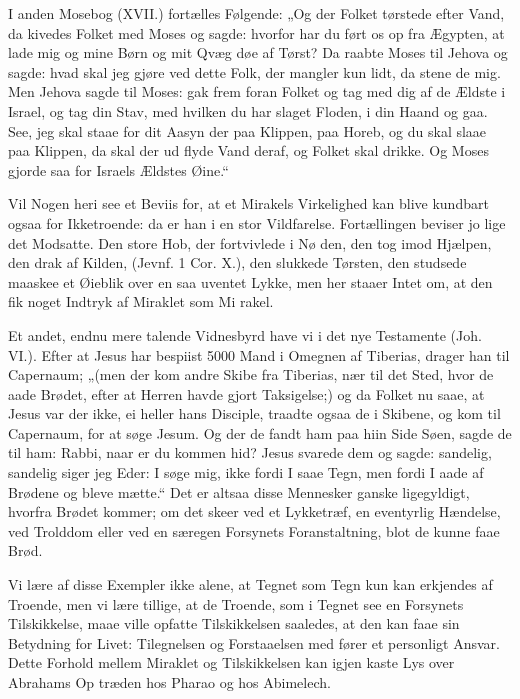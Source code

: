 \documentclass[12pt]{book}
\newcommand{\opage}[1]{\marginnote{\footnotesize\textit{[#1]}}}
\begin{document}
I anden Mosebog (XVII.) fortælles Følgende: „Og
der Folket tørstede efter Vand, da kivedes Folket med
Moses og sagde: hvorfor har du ført os op fra Ægypten,
at lade mig og mine Børn og mit Qvæg døe af Tørst?
Da raabte Moses til Jehova og sagde: hvad skal jeg
gjøre ved dette Folk, der mangler kun lidt, da stene de
mig. Men Jehova sagde til Moses: gak frem foran Folket
og tag med dig af de Ældste i Israel, og tag din Stav,
med hvilken du har slaget Floden, i din Haand og gaa.
See, jeg skal staae for dit Aasyn der paa Klippen, paa
Horeb, og du skal slaae paa Klippen, da skal der ud\-%
flyde Vand deraf, og Folket skal drikke. Og Moses
gjorde saa for Israels Ældstes Øine.“

Vil Nogen heri see et Beviis for, at et Mirakels
Virkelighed kan blive kundbart ogsaa for Ikketroende:
da er han i en stor Vildfarelse. Fortællingen beviser jo
lige det Modsatte. Den store Hob, der fortvivlede i Nø\-%
den, den tog imod Hjælpen, den drak af Kilden, (Jevnf.
1 Cor. X.), den slukkede Tørsten, den studsede maaskee
et Øieblik over en saa uventet Lykke, men her staaer
Intet om, at den fik noget Indtryk af Miraklet som Mi\-%
rakel.

Et andet, endnu mere talende Vidnesbyrd have vi
i det nye Testamente (Joh. VI.). Efter at Jesus har
bespiist 5000 Mand i Omegnen af Tiberias, drager han
til Capernaum; „(men der kom andre Skibe fra Tiberias,
nær til det Sted, hvor de aade Brødet, efter at Herren
havde gjort Taksigelse;) og da Folket nu saae, at Jesus
var der ikke, ei heller hans Disciple, traadte ogsaa de i
Skibene, og kom til Capernaum, for at søge Jesum. Og
\opage{216}\setcounter{footnote}{0}%
der de fandt ham paa hiin Side Søen, sagde de til ham:
Rabbi, naar er du kommen hid? Jesus svarede dem og
sagde: sandelig, sandelig siger jeg Eder: I søge mig,
ikke fordi I saae Tegn, men fordi I aade af Brødene og
bleve mætte.“ Det er altsaa disse Mennesker ganske
ligegyldigt, hvorfra Brødet kommer; om det skeer ved
et Lykketræf, en eventyrlig Hændelse, ved Trolddom
eller ved en særegen Forsynets Foranstaltning, blot de
kunne faae Brød.

Vi lære af disse Exempler ikke alene, at Tegnet som
Tegn kun kan erkjendes af Troende, men vi lære tillige,
at de Troende, som i Tegnet see en Forsynets Tilskikkelse,
maae ville opfatte Tilskikkelsen saaledes, at den kan faae
sin Betydning for Livet: Tilegnelsen og Forstaaelsen med\-%
fører et personligt Ansvar. Dette Forhold mellem Miraklet
og Tilskikkelsen kan igjen kaste Lys over Abrahams Op\-%
træden hos Pharao og hos Abimelech.
\end{document}

